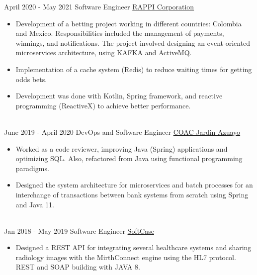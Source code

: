 \documentclass[letterpaper]{twentysecondcv} %
\begin{document}
\begin{twenty}

\twentyitem
    {April 2020 -}
    {May 2021}
    {Software Engineer}
    {\href{https://www.rappi.com.ec/}{RAPPI Corporation}}
    {}
    {
        \begin{itemize}
            \item Development of a betting project working in different countries: Colombia and Mexico. Responsibilities included the management of payments, winnings, and notifications. The project involved designing an event-oriented microservices architecture, using KAFKA and ActiveMQ.
         \end{itemize}

        \begin{itemize}
            \item Implementation of a cache system (Redis) to reduce waiting times for getting odds bets.
         \end{itemize}

        \begin{itemize}
            \item Development was done with Kotlin, Spring framework, and reactive programming (ReactiveX) to achieve better performance.
         \end{itemize}
    }
    \\

\twentyitem
    {June 2019 -}
    {April 2020}
    {DevOps and Software Engineer}
    {\href{https://www.jardinazuayo.fin.ec/}{COAC Jardin Azuayo}}
    {}
    {
        \begin{itemize}
            \item Worked as a code reviewer, improving Java (Spring) applications and optimizing SQL. Also, refactored from Java using functional programming paradigms.
         \end{itemize}

        \begin{itemize}
            \item Designed the system architecture for microservices and batch processes for an interchange of transactions between bank systems from scratch using Spring and Java 11.
         \end{itemize}
    }
    \\

\twentyitem
    {Jan 2018 -}
    {May 2019}
    {Software Engineer}
    {\href{http://www.softcase.com.ec/}{SoftCase}}
    {}
    {
        \begin{itemize}
            \item Designed a REST API for integrating several healthcare systems and sharing radiology images with the MirthConnect engine using the HL7 protocol. REST and SOAP building with JAVA 8.
         \end{itemize}
    }
    \\



\end{twenty}
\end{document}

